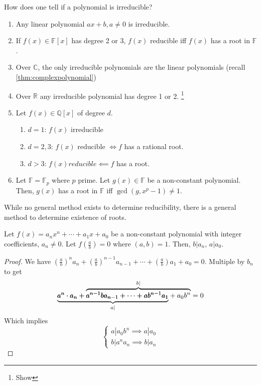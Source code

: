 \documentclass[12pt,oneside]{article}
\begin{document}
\begin{remark}
  How does one tell if a polynomial is irreducible?
  \begin{enumerate}
    \item Any linear polynomial $ax + b, a \neq 0$ is irreducible.
    \item If $f(x) \in \mathbb{F}[x]$ has degree 2 or 3, $f(x)$ reducible iff $f(x)$ has a root in $\mathbb{F}$.
    \item Over $\mathbb{C}$, the only irreducible polynomials are the linear polynomials (recall \cref{thm:complexpolynomial})
    \item Over $\mathbb{R}$ any irreducible polynomial has degree 1 or 2. \footnote{Show}
    \item Let $f(x) \in \mathbb{Q}[x]$ of degree $d$.
    \begin{enumerate}
      \item $d=1$: $f(x)$ irreducible
      \item $d = 2, 3$: $f(x)$ reducible $\iff f$ has a rational root.
      \item $d > 3$: $f(x) reducible \impliedby f$ has a root.
    \end{enumerate}
    \item Let $\mathbb{F} = \mathbb{F}_p$ where $p$ prime. Let $g(x) \in \mathbb{F}$ be a non-constant polynomial. Then, $g(x)$ has a root in $\mathbb{F}$ iff $\gcd (g, x^p - 1) \neq 1$.
  \end{enumerate}
  While no general method exists to determine reducibility, there is a general method to determine existence of roots.
\end{remark}
\begin{proposition}
  Let $f(x) = a_n x^{n} + \cdots + a_1 x + a_0$ be a non-constant polynomial with integer coefficients, $a_n \neq 0$. Let $f(\frac{a}{b}) = 0$ where $(a,b) = 1$. Then, $b | a_n$, $a|a_0$.
\end{proposition}

\begin{proof}
  We have $\left(\frac{a}{b}\right)^n a_n + \left(\frac{a}{b}\right)^{n-1}a_{n-1} + \cdots + \left(\frac{a}{b}\right)a_1 + a_0 = 0$. Multiple by $b_n$ to get 
  \[
  \lefteqn{\underbrace{a^n \cdot a_n + a^{n-1} b a_{n-1} + \cdots + a b^{n-1}a_1}_{a|}\phantom{ + a_0 b^n = 0}}a^n \cdot a_n + \overbrace{a^{n-1} b a_{n-1} + \cdots + a b^{n-1}a_1 + a_0 b^n}^{b|} = 0
  \]
  Which implies \[
  \begin{cases}
    a | a_0 b^n \implies a | a_0\\
    b | a^n a_n \implies b | a_n
  \end{cases}  
  \]
\end{proof}
\end{document}
